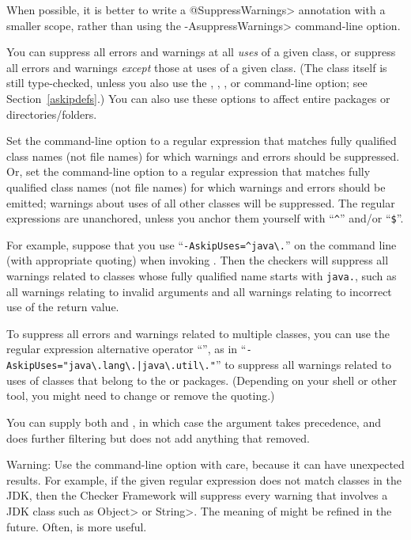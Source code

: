 When possible, it is better to write a \<@SuppressWarnings> annotation with a
smaller scope, rather than using the \<-AsuppressWarnings> command-line option.



You can suppress all errors and warnings at all \emph{uses} of a given
class, or suppress all errors and warnings \emph{except} those at uses of a given
class.  (The class itself is still type-checked, unless you also use
the , , , or 
command-line option; see Section~\ref{askipdefs}.)
You can also use these options to affect entire packages or directories/folders.

Set the  command-line option to a
regular expression that matches fully qualified class names (not file names) for which warnings and errors
should be suppressed.
Or, set the  command-line option to a
regular expression that matches fully qualified class names (not file names) for which warnings and errors
should be emitted; warnings about uses of all other classes will be suppressed.
The regular expressions are unanchored, unless you anchor them yourself
with ``\codesize\verb|^|'' and/or ``\codesize\verb|$|''.

For example, suppose that you use
``{\codesize\verb|-AskipUses=^java\.|}'' on the command line
(with appropriate quoting) when invoking
.  Then the checkers will suppress all warnings related to
classes whose fully qualified name starts with \codesize\verb|java.|, such
as all warnings relating to invalid arguments and all warnings relating to
incorrect use of the return value.

To suppress all errors and warnings related to multiple classes, you can use
the regular expression alternative operator ``\code{|}'', as in
``{\codesize\verb+-AskipUses="java\.lang\.|java\.util\."+}'' to suppress
all warnings related to uses of classes that belong to the  or
 packages.  (Depending on your shell or other tool, you
might need to change or remove the quoting.)

You can supply both  and , in which case
the  argument takes precedence, and  does
further filtering but does not add anything that  removed.

Warning:  Use the  command-line option with care,
because it can have unexpected results.  For example, if the
given regular expression does not match classes in the JDK, then the
Checker Framework will suppress every warning that involves a JDK class
such as \<Object> or \<String>.  The meaning of  might be
refined in the future.  Often,  is more useful.

